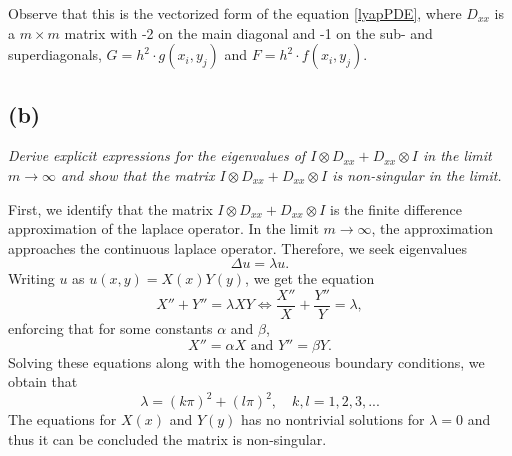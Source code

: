 Observe that this is the vectorized form of the equation \eqref{lyapPDE}, where
$D_{xx}$ is a $m\times m$ matrix with -2 on the main diagonal and -1 on the sub- and superdiagonals, $G =h^2\cdot g(x_i,y_j)$ and $F = h^2\cdot f(x_i,y_j)$.
\subsection*{(b)}
\emph{Derive explicit expressions for the eigenvalues of $I\otimes D_{xx}+D_{xx}\otimes I$ in the limit $m\to\infty$ and show that the matrix $I\otimes D_{xx}+D_{xx}\otimes I$ is non-singular in the limit.}

First, we identify that the matrix $I\otimes D_{xx}+D_{xx}\otimes I$ is the finite difference approximation of the laplace operator. In the limit $m\to\infty$, the approximation approaches the continuous laplace operator. Therefore, we seek eigenvalues
\begin{equation}
\Delta u = \lambda u.
\end{equation}
Writing $u$ as $u(x,y) = X(x)Y(y)$, we get the equation
\begin{equation}
X''+Y'' = \lambda XY \Leftrightarrow \frac{X''}{X}+\frac{Y''}{Y} = \lambda,
\end{equation}
enforcing that for some constants $\alpha$ and $\beta$,
\begin{equation}
X''=\alpha X\text{ and }Y'' = \beta Y.
\end{equation}
Solving these equations along with the homogeneous boundary conditions, we obtain that
\begin{equation}
\lambda = (k\pi)^2+(l\pi)^2,\quad k,l = 1,2,3,...
\end{equation}
The equations for $X(x)$ and $Y(y)$ has no nontrivial solutions for $\lambda =0$ and thus it can be concluded the matrix is non-singular.
